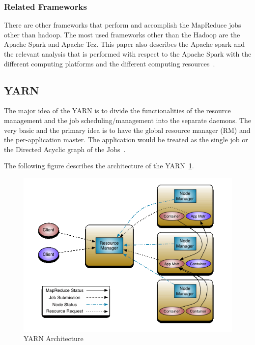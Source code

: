 \subsubsection{Related Frameworks}
There are other frameworks that perform and accomplish the 
MapReduce jobs other than hadoop. The most used frameworks 
other than the Hadoop are the Apache Spark and Apache Tez. 
This paper also describes the Apache spark and the relevant 
analysis that is performed with respect to the Apache Spark 
with the different computing platforms and the 
different computing resources~\cite{hid-sp18-412-hadoop-architecture-overview}.

\subsection{YARN}
The major idea of the YARN is to divide the functionalities of the 
resource management and the job scheduling/management into 
the separate daemons. The very basic and the primary idea 
is to have the global resource manager (RM) and the per-application master. 
The application would be treated as the single job 
or the Directed Acyclic 
graph of the Jobs~\cite{hid-sp18-412-YARN_Architecture}.

The following figure describes the architecture 
of the YARN~\ref{s:archiyarn}.

\begin{figure}[!ht]
\centering\includegraphics[width=\textwidth]{images/YARNArchitecture.png}
\caption{YARN 
Architecture~\cite{hid-sp18-412-YARN_Architecture}}\label{s:archiyarn}
\end{figure}

